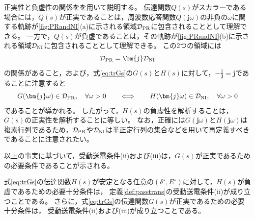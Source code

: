 \documentclass[tombow,dvipdfmx]{corona-a5-1.1}
\begin{document}
正実性と負虚性の関係をを用いて説明する。
伝達関数$Q(s)$がスカラーである場合には，$Q(s)$が正実であることは，周波数応答関数$Q(\bm{j} \omega)$の非負の$\omega$に関する軌跡が\ref{fig:PRandNI}(a)に示される領域$\mathcal{D}_{\rm PR}$に包含されることとして理解できる。
一方で，$Q(s)$が負虚であることは，その軌跡が\ref{fig:PRandNI}(b)に示される領域$\mathcal{D}_{\rm NI}$に包含されることとして理解できる。
この2つの領域には
\[
\mathcal{D}_{\rm PR} = \bm{j} \mathcal{D}_{\rm NI}
\]
の関係があること，および，式\ref{eq:trGs}の$G(s)$と$H(s)$に対して，$-\tfrac{1}{\bm{j}}=\bm{j}$であることに注意すると
\[
G(\bm{j} \omega) \in \mathcal{D}_{\rm PR}, 
\quad \forall \omega >0
\qquad
\Longleftrightarrow
\qquad
H(\bm{j} \omega) \in \mathcal{D}_{\rm NI} ,
\quad \forall \omega >0
\]
であることが導かれる。
したがって，$H(s)$の負虚性を解析することは，$G(s)$の正実性を解析することに等しい。
なお，正確には$G(\bm{j} \omega)$と$H(\bm{j} \omega)$は複素行列であるため，$\mathcal{D}_{\rm PR}$や$\mathcal{D}_{\rm NI}$は半正定行列の集合などを用いて再定義すべきであることに注意されたい。

以上の事実に基づいて，受動送電条件(ii)および(iii)は，$G(s)$が正実であるための必要条件であることが示される。

\begin{定理}[電気サブシステムの伝達関数の正実性]
\label{thm:EdynNI}
式\ref{eq:trGs}の伝達関数$H(s)$が安定となる任意の$(\delta^{\star},E^{\star})$に対して，$H(s)$が負虚であるための必要十分条件は，
定義\ref{def:passtrans}の受動送電条件(ii)が成り立つことである。
さらに，式\ref{eq:trGs}の伝達関数$G(s)$が正実であるための必要十分条件は，
受動送電条件(ii)および(iii)が成り立つことである。
\end{定理}
\end{document}
